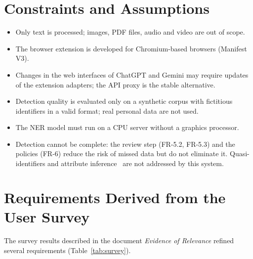 \documentclass[12pt,a4paper]{article}
\begin{document}
\section{Constraints and Assumptions}

\begin{itemize}
\item Only text is processed; images, PDF files, audio and video are out of scope.
\item The browser extension is developed for Chromium-based browsers (Manifest V3).
\item Changes in the web interfaces of ChatGPT and Gemini may require updates of the extension adapters; the API proxy is the stable alternative.
\item Detection quality is evaluated only on a synthetic corpus with fictitious identifiers in a valid format; real personal data are not used.
\item The NER model must run on a CPU server without a graphics processor.
\item Detection cannot be complete: the review step (FR-5.2, FR-5.3) and the policies (FR-6) reduce the risk of missed data but do not eliminate it. Quasi-identifiers and attribute inference~\cite{lukas} are not addressed by this system.
\end{itemize}

\section{Requirements Derived from the User Survey}

The survey results described in the document \emph{Evidence of Relevance} refined several requirements (Table~\ref{tab:survey}).
\end{document}
